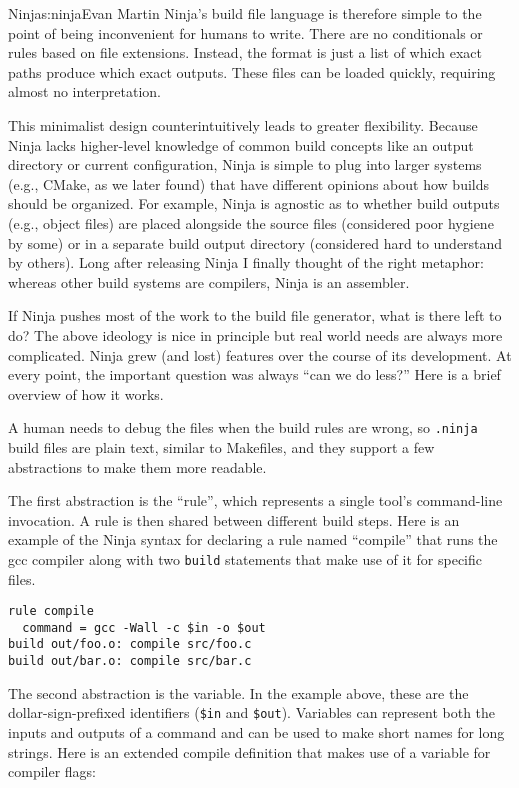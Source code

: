\begin{aosachapter}{Ninja}{s:ninja}{Evan Martin}
Ninja's build file language is therefore simple to the point of being
inconvenient for humans to write. There are no conditionals or rules
based on file extensions. Instead, the format is just a list of which
exact paths produce which exact outputs. These files can be loaded
quickly, requiring almost no interpretation.

This minimalist design counterintuitively leads to greater flexibility.
Because Ninja lacks higher-level knowledge of common build concepts like
an output directory or current configuration, Ninja is simple to plug
into larger systems (e.g., CMake, as we later found) that have different
opinions about how builds should be organized. For example, Ninja is
agnostic as to whether build outputs (e.g., object files) are placed
alongside the source files (considered poor hygiene by some) or in a
separate build output directory (considered hard to understand by
others). Long after releasing Ninja I finally thought of the right
metaphor: whereas other build systems are compilers, Ninja is an
assembler.


If Ninja pushes most of the work to the build file generator, what is
there left to do? The above ideology is nice in principle but real world
needs are always more complicated. Ninja grew (and lost) features over
the course of its development. At every point, the important question
was always ``can we do less?'' Here is a brief overview of how it works.

A human needs to debug the files when the build rules are wrong, so
\texttt{.ninja} build files are plain text, similar to Makefiles, and
they support a few abstractions to make them more readable.

The first abstraction is the ``rule'', which represents a single tool's
command-line invocation. A rule is then shared between different build
steps. Here is an example of the Ninja syntax for declaring a rule named
``compile'' that runs the gcc compiler along with two \texttt{build}
statements that make use of it for specific files.

\begin{verbatim}
rule compile
  command = gcc -Wall -c $in -o $out
build out/foo.o: compile src/foo.c
build out/bar.o: compile src/bar.c
\end{verbatim}

The second abstraction is the variable. In the example above, these are
the dollar-sign-prefixed identifiers (\texttt{\$in} and \texttt{\$out}).
Variables can represent both the inputs and outputs of a command and can
be used to make short names for long strings. Here is an extended
compile definition that makes use of a variable for compiler flags:


\end{aosachapter}
